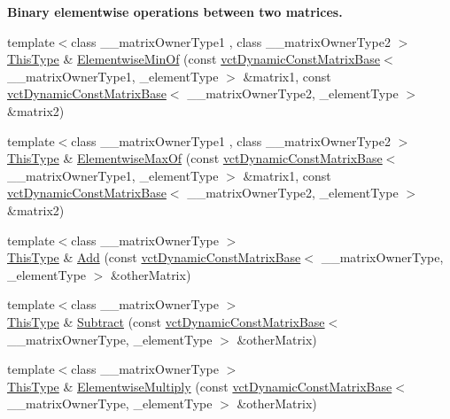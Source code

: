 \begin{Indent}{\bf Binary elementwise operations between two matrices.}
\begin{DoxyCompactItemize}
\item 
{\footnotesize template$<$class \-\_\-\-\_\-matrix\-Owner\-Type1 , class \-\_\-\-\_\-matrix\-Owner\-Type2 $>$ }\\\hyperlink{classvct_dynamic_const_matrix_base_ac4ff48cbe4d9de3fdef5a02447ffb9db}{This\-Type} \& \hyperlink{classvct_dynamic_matrix_base_a23b742730444699d26209e922b41478e}{Elementwise\-Min\-Of} (const \hyperlink{classvct_dynamic_const_matrix_base}{vct\-Dynamic\-Const\-Matrix\-Base}$<$ \-\_\-\-\_\-matrix\-Owner\-Type1, \-\_\-element\-Type $>$ \&matrix1, const \hyperlink{classvct_dynamic_const_matrix_base}{vct\-Dynamic\-Const\-Matrix\-Base}$<$ \-\_\-\-\_\-matrix\-Owner\-Type2, \-\_\-element\-Type $>$ \&matrix2)
\item 
{\footnotesize template$<$class \-\_\-\-\_\-matrix\-Owner\-Type1 , class \-\_\-\-\_\-matrix\-Owner\-Type2 $>$ }\\\hyperlink{classvct_dynamic_const_matrix_base_ac4ff48cbe4d9de3fdef5a02447ffb9db}{This\-Type} \& \hyperlink{classvct_dynamic_matrix_base_ab607f089d64a6f034400240370425d03}{Elementwise\-Max\-Of} (const \hyperlink{classvct_dynamic_const_matrix_base}{vct\-Dynamic\-Const\-Matrix\-Base}$<$ \-\_\-\-\_\-matrix\-Owner\-Type1, \-\_\-element\-Type $>$ \&matrix1, const \hyperlink{classvct_dynamic_const_matrix_base}{vct\-Dynamic\-Const\-Matrix\-Base}$<$ \-\_\-\-\_\-matrix\-Owner\-Type2, \-\_\-element\-Type $>$ \&matrix2)
\item 
{\footnotesize template$<$class \-\_\-\-\_\-matrix\-Owner\-Type $>$ }\\\hyperlink{classvct_dynamic_const_matrix_base_ac4ff48cbe4d9de3fdef5a02447ffb9db}{This\-Type} \& \hyperlink{classvct_dynamic_matrix_base_a44eea9ec4006fa9e9b8c8e85a8318c91}{Add} (const \hyperlink{classvct_dynamic_const_matrix_base}{vct\-Dynamic\-Const\-Matrix\-Base}$<$ \-\_\-\-\_\-matrix\-Owner\-Type, \-\_\-element\-Type $>$ \&other\-Matrix)
\item 
{\footnotesize template$<$class \-\_\-\-\_\-matrix\-Owner\-Type $>$ }\\\hyperlink{classvct_dynamic_const_matrix_base_ac4ff48cbe4d9de3fdef5a02447ffb9db}{This\-Type} \& \hyperlink{classvct_dynamic_matrix_base_af51cf2643c299d3b2508eb28b474ba74}{Subtract} (const \hyperlink{classvct_dynamic_const_matrix_base}{vct\-Dynamic\-Const\-Matrix\-Base}$<$ \-\_\-\-\_\-matrix\-Owner\-Type, \-\_\-element\-Type $>$ \&other\-Matrix)
\item 
{\footnotesize template$<$class \-\_\-\-\_\-matrix\-Owner\-Type $>$ }\\\hyperlink{classvct_dynamic_const_matrix_base_ac4ff48cbe4d9de3fdef5a02447ffb9db}{This\-Type} \& \hyperlink{classvct_dynamic_matrix_base_ae6607dc37f9a9b6a2800d1b5b451c9ac}{Elementwise\-Multiply} (const \hyperlink{classvct_dynamic_const_matrix_base}{vct\-Dynamic\-Const\-Matrix\-Base}$<$ \-\_\-\-\_\-matrix\-Owner\-Type, \-\_\-element\-Type $>$ \&other\-Matrix)

\end{DoxyCompactItemize}
\end{Indent}
